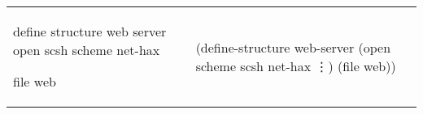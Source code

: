 \documentclass{report}
\begin{document}
\begin{tabular}{ll}
{\begin{codebox}[b]
define structure web server
   open scsh
        scheme
        net-hax
        
   file web\end{codebox}}
&
{\begin{codebox}[b]
(define-structure web-server
  (open scheme
        scsh
        net-hax
        \vdots)
  (file web))\end{codebox}}\\
\end{tabular}
\end{document}
